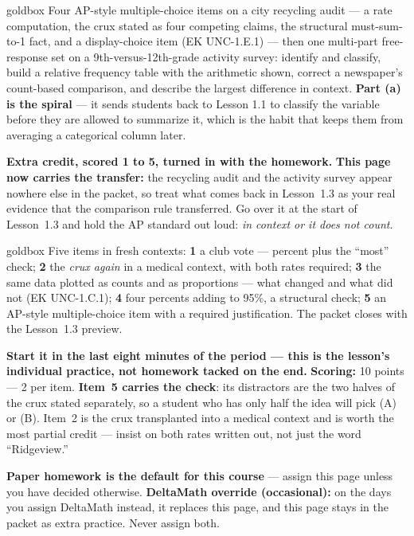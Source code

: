 \documentclass[10pt]{article}
\begin{document}
\boxguard
\begin{skillbox}{goldbox}
Four AP-style multiple-choice items on a city recycling audit --- a rate computation, the crux
stated as four competing claims, the structural must-sum-to-1 fact, and a display-choice item
(EK UNC-1.E.1) --- then one multi-part free-response set on a 9th-versus-12th-grade activity
survey: identify and classify, build a relative frequency table with the arithmetic shown,
correct a newspaper's count-based comparison, and describe the largest difference in context.
\textbf{Part (a) is the spiral} --- it sends students back to Lesson 1.1 to classify the variable
before they are allowed to summarize it, which is the habit that keeps them from averaging a
categorical column later.

\textbf{Extra credit, scored 1 to 5, turned in with the homework.} \textbf{This
page now carries the transfer:} the recycling audit and the activity survey appear nowhere else
in the packet, so treat what comes back in Lesson~1.3 as your real evidence that the comparison
rule transferred. Go over it at the start of Lesson~1.3 and hold the AP standard out loud:
\emph{in context or it does not count}.
\end{skillbox}

\boxguard
\begin{skillbox}{goldbox}
Five items in fresh contexts: \textbf{1} a club vote --- percent plus the ``most'' check;
\textbf{2} the \emph{crux again} in a medical context, with both rates required; \textbf{3} the
same data plotted as counts and as proportions --- what changed and what did not (EK UNC-1.C.1);
\textbf{4} four percents adding to 95\%, a structural check; \textbf{5} an AP-style
multiple-choice item with a required justification. The packet closes with the Lesson~1.3
preview.

\textbf{Start it in the last eight minutes of the period --- this is the lesson's individual
practice, not homework tacked on the end.} \textbf{Scoring:} 10 points --- 2 per item. \textbf{Item~5 carries the check}: its distractors are the two halves of the crux stated
separately, so a student who has only half the idea will pick (A) or (B). Item~2 is the crux
transplanted into a medical context and is worth the most partial credit --- insist on both rates
written out, not just the word ``Ridgeview.''

\textbf{Paper homework is the default for this course} --- assign this page unless you have
decided otherwise. \textbf{DeltaMath override (occasional):} on the days you assign DeltaMath
instead, it replaces this page, and this page
stays in the packet as extra practice. Never assign both.
\end{skillbox}
\end{document}
